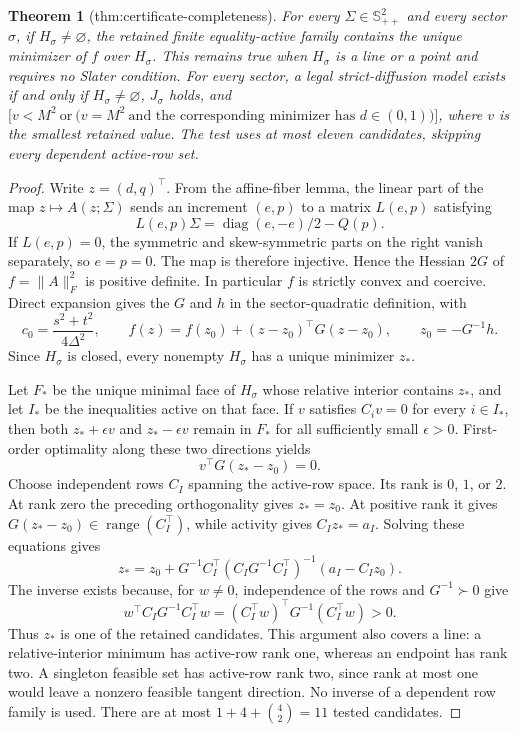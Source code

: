 \documentclass{article}
\newtheorem{theorem}{Theorem}
\begin{document}
\begin{theorem}[thm:certificate-completeness]\label{thm:certificate-completeness}
For every \(\Sigma\in\mathbb S_{++}^2\) and every sector \(\sigma\), if \(H_{\sigma}\ne\varnothing\), the retained finite equality-active family contains the unique minimizer of \(f\) over \(H_{\sigma}\).  This remains true when \(H_{\sigma}\) is a line or a point and requires no Slater condition.  For every sector, a legal strict-diffusion model exists if and only if \(H_{\sigma}\ne\varnothing\), \(J_{\sigma}\) holds, and \(\bigl[v<M^2\ \text{or}\ \bigl(v=M^2\ \text{and the corresponding minimizer has }d\in(0,1)\bigr)\bigr]\), where \(v\) is the smallest retained value.  The test uses at most eleven candidates, skipping every dependent active-row set.
\end{theorem}
\begin{proof}
Write \(z=(d,q)^{\top}\).  From the affine-fiber lemma, the linear part of the map \(z\mapsto A(z;\Sigma)\) sends an increment \((e,p)\) to a matrix \(L(e,p)\) satisfying
\[
 L(e,p)\Sigma=\operatorname{diag}(e,-e)/2-Q(p).
\]
If \(L(e,p)=0\), the symmetric and skew-symmetric parts on the right vanish separately, so \(e=p=0\).  The map is therefore injective.  Hence the Hessian \(2G\) of \(f=\lVert A\rVert_F^2\) is positive definite.  In particular \(f\) is strictly convex and coercive.  Direct expansion gives the \(G\) and \(h\) in the sector-quadratic definition, with
\[
 c_0=\frac{s^2+t^2}{4\Delta^2},\qquad
 f(z)=f(z_0)+(z-z_0)^{\top}G(z-z_0),\qquad z_0=-G^{-1}h.
\]
Since \(H_{\sigma}\) is closed, every nonempty \(H_{\sigma}\) has a unique minimizer \(z_*\).

Let \(F_*\) be the unique minimal face of \(H_{\sigma}\) whose relative interior contains \(z_*\), and let \(I_*\) be the inequalities active on that face.  If \(v\) satisfies \(C_i v=0\) for every \(i\in I_*\), then both \(z_*+\epsilon v\) and \(z_*-\epsilon v\) remain in \(F_*\) for all sufficiently small \(\epsilon>0\).  First-order optimality along these two directions yields
\[
 v^{\top}G(z_*-z_0)=0.
\]
Choose independent rows \(C_I\) spanning the active-row space.  Its rank is \(0\), \(1\), or \(2\).  At rank zero the preceding orthogonality gives \(z_*=z_0\).  At positive rank it gives \(G(z_*-z_0)\in\operatorname{range}(C_I^{\top})\), while activity gives \(C_Iz_*=a_I\).  Solving these equations gives
\[
 z_*=z_0+G^{-1}C_I^{\top}
 (C_IG^{-1}C_I^{\top})^{-1}(a_I-C_Iz_0).
\]
The inverse exists because, for \(w\ne0\), independence of the rows and \(G^{-1}\succ0\) give
\[
 w^{\top}C_IG^{-1}C_I^{\top}w
 =(C_I^{\top}w)^{\top}G^{-1}(C_I^{\top}w)>0.
\]
Thus \(z_*\) is one of the retained candidates.  This argument also covers a line: a relative-interior minimum has active-row rank one, whereas an endpoint has rank two.  A singleton feasible set has active-row rank two, since rank at most one would leave a nonzero feasible tangent direction.  No inverse of a dependent row family is used.  There are at most \(1+4+\binom42=11\) tested candidates.


\end{proof}
\end{document}
